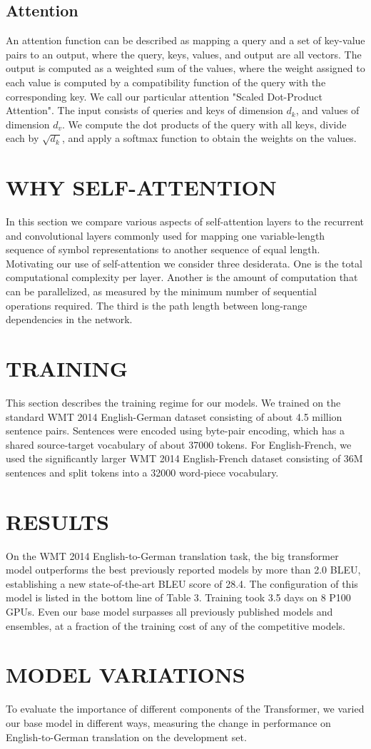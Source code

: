 \documentclass[conference]{IEEEtran}
\begin{document}
\subsection{Attention}
An attention function can be described as mapping a query and a set of key-value pairs to an output, where the query, keys, values, and output are all vectors. The output is computed as a weighted sum of the values, where the weight assigned to each value is computed by a compatibility function of the query with the corresponding key. We call our particular attention "Scaled Dot-Product Attention". The input consists of queries and keys of dimension $d_k$, and values of dimension $d_v$. We compute the dot products of the query with all keys, divide each by $\sqrt{d_k}$, and apply a softmax function to obtain the weights on the values.

\section{WHY SELF-ATTENTION}
In this section we compare various aspects of self-attention layers to the recurrent and convolutional layers commonly used for mapping one variable-length sequence of symbol representations to another sequence of equal length. Motivating our use of self-attention we consider three desiderata. One is the total computational complexity per layer. Another is the amount of computation that can be parallelized, as measured by the minimum number of sequential operations required. The third is the path length between long-range dependencies in the network.

\section{TRAINING}
This section describes the training regime for our models. We trained on the standard WMT 2014 English-German dataset consisting of about 4.5 million sentence pairs. Sentences were encoded using byte-pair encoding, which has a shared source-target vocabulary of about 37000 tokens. For English-French, we used the significantly larger WMT 2014 English-French dataset consisting of 36M sentences and split tokens into a 32000 word-piece vocabulary.

\section{RESULTS}
On the WMT 2014 English-to-German translation task, the big transformer model outperforms the best previously reported models by more than 2.0 BLEU, establishing a new state-of-the-art BLEU score of 28.4. The configuration of this model is listed in the bottom line of Table 3. Training took 3.5 days on 8 P100 GPUs. Even our base model surpasses all previously published models and ensembles, at a fraction of the training cost of any of the competitive models.

\section{MODEL VARIATIONS}
To evaluate the importance of different components of the Transformer, we varied our base model in different ways, measuring the change in performance on English-to-German translation on the development set.
\end{document}
